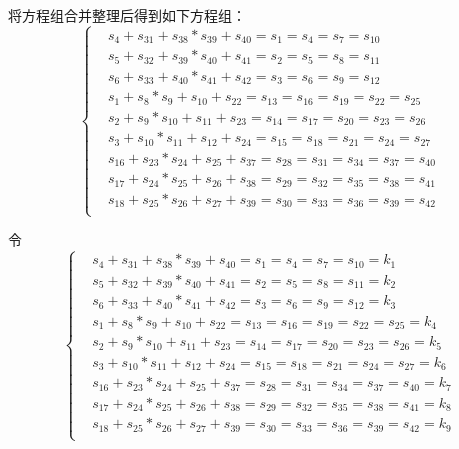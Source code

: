 将方程组合并整理后得到如下方程组：
\begin{equation}
\left\{
\begin{aligned}
&s_{4}+s_{31}+s_{38}*s_{39}+s_{40}=s_{1}=s_{4}=s_{7}=s_{10}\\
&s_{5}+s_{32}+s_{39}*s_{40}+s_{41}=s_{2}=s_{5}=s_{8}=s_{11}\\
&s_{6}+s_{33}+s_{40}*s_{41}+s_{42}=s_{3}=s_{6}=s_{9}=s_{12}\\
&s_{1}+s_{8}*s_{9}+s_{10}+s_{22}=s_{13}=s_{16}=s_{19}=s_{22}=s_{25}\\
&s_{2}+s_{9}*s_{10}+s_{11}+s_{23}=s_{14}=s_{17}=s_{20}=s_{23}=s_{26}\\
&s_{3}+s_{10}*s_{11}+s_{12}+s_{24}=s_{15}=s_{18}=s_{21}=s_{24}=s_{27}\\
&s_{16}+s_{23}*s_{24}+s_{25}+s_{37}=s_{28}=s_{31}=s_{34}=s_{37}=s_{40}\\
&s_{17}+s_{24}*s_{25}+s_{26}+s_{38}=s_{29}=s_{32}=s_{35}=s_{38}=s_{41}\\
&s_{18}+s_{25}*s_{26}+s_{27}+s_{39}=s_{30}=s_{33}=s_{36}=s_{39}=s_{42}\\
\end{aligned}
\right.
\end{equation}


令
\begin{equation}
\left\{
\begin{aligned}
&s_{4}+s_{31}+s_{38}*s_{39}+s_{40}=s_{1}=s_{4}=s_{7}=s_{10}=k_{1}\\
&s_{5}+s_{32}+s_{39}*s_{40}+s_{41}=s_{2}=s_{5}=s_{8}=s_{11}=k_{2}\\
&s_{6}+s_{33}+s_{40}*s_{41}+s_{42}=s_{3}=s_{6}=s_{9}=s_{12}=k_{3}\\
&s_{1}+s_{8}*s_{9}+s_{10}+s_{22}=s_{13}=s_{16}=s_{19}=s_{22}=s_{25}=k_{4}\\
&s_{2}+s_{9}*s_{10}+s_{11}+s_{23}=s_{14}=s_{17}=s_{20}=s_{23}=s_{26}=k_{5}\\
&s_{3}+s_{10}*s_{11}+s_{12}+s_{24}=s_{15}=s_{18}=s_{21}=s_{24}=s_{27}=k_{6}\\
&s_{16}+s_{23}*s_{24}+s_{25}+s_{37}=s_{28}=s_{31}=s_{34}=s_{37}=s_{40}=k_{7}\\
&s_{17}+s_{24}*s_{25}+s_{26}+s_{38}=s_{29}=s_{32}=s_{35}=s_{38}=s_{41}=k_{8}\\
&s_{18}+s_{25}*s_{26}+s_{27}+s_{39}=s_{30}=s_{33}=s_{36}=s_{39}=s_{42}=k_{9}\\
\end{aligned}
\right.
\end{equation}


